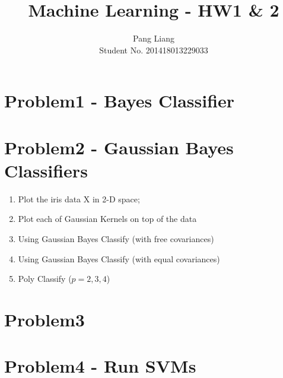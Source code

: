 \documentclass[12pt]{article}
\title{Machine Learning - HW1 & 2}
\author{Pang Liang\\ Student No. 201418013229033}
\begin{document}
\maketitle

\section{Problem1 - Bayes Classifier}


\section{Problem2 - Gaussian Bayes Classifiers}
\begin{enumerate}
    \item Plot the iris data X in 2-D space;
    
    \item Plot each of Gaussian Kernels on top of the data
    
    \item Using Gaussian Bayes Classify (with free covariances)
    
    \item Using Gaussian Bayes Classify (with equal covariances)
    
    \item Poly Classify ($p = 2,3,4$)
    
\end{enumerate}


\section{Problem3}


\section{Problem4 - Run SVMs}
\end{document}
